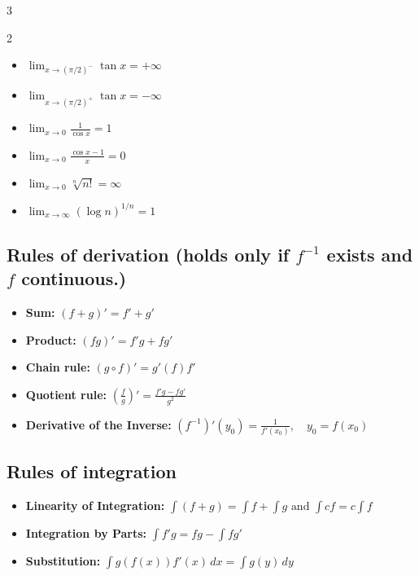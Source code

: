 \begin{multicols*}{3}
\begin{multicols}{2}
\begin{itemize}[noitemsep, topsep=0pt, leftmargin=*]
\item $\lim_{x\to(\pi/2)^-}\tan x=+\infty$
\item $\lim_{x\to(\pi/2)^+}\tan x=-\infty$

\item $\lim_{x\to0}\frac1{\cos x}=1$
\item $\lim_{x\to0}\frac{\cos x-1}{x}=0$
\item $\lim_{x\to0} \sqrt[n]{n!} = \infty$
\item $\lim_{x\to\infty} (\log n)^{1/n} = 1$
\end{itemize}
\end{multicols}

\subsection*{Rules of derivation (holds only if $f^{-1}$ exists and $f$ continuous.)}
\begin{itemize}[noitemsep, topsep=0pt, leftmargin=*]
\item \textbf{Sum:}
\(
(f+g)'=f'+g'
\)
\item \textbf{Product:}
\(
(fg)'=f'g+fg'
\)
\item \textbf{Chain rule:}
\(
(g\circ f)'=g'(f)f'
\)
\item \textbf{Quotient rule:}
\(
\left(\frac fg\right)'=\frac{f'g-fg'}{g^2}
\)
\item \textbf{Derivative of the Inverse:}
\(
(f^{-1})'(y_0)=\frac1{f'(x_0)},\quad y_0=f(x_0)
\)
\end{itemize}


\subsection*{Rules of integration}
\begin{itemize}[noitemsep, topsep=0pt, leftmargin=*]
\item \textbf{Linearity of Integration:}
\(
\int(f+g)=\int f+\int g \text{ and }
\int cf=c\int f
\)
\item \textbf{Integration by Parts:}
\(
\int f'g=fg-\int fg'
\)
\item \textbf{Substitution:}
\(
\int g(f(x))f'(x)\,dx=\int g(y)\,dy
\)
\end{itemize}


\end{multicols*}
